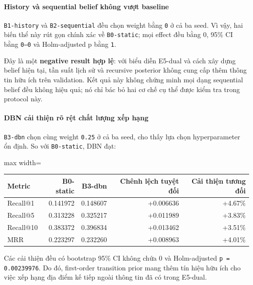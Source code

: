 \paragraph{History và sequential belief không vượt baseline}

\texttt{B1-history} và \texttt{B2-sequential} đều chọn weight bằng \texttt{0} ở cả ba seed. Vì vậy, hai biến thể này rút gọn chính xác về \texttt{B0-static}; mọi effect đều bằng 0, 95\% CI bằng \texttt{0--0} và Holm-adjusted p bằng \texttt{1}.

Đây là một \textbf{negative result hợp lệ}: với biểu diễn E5-dual và cách xây dựng belief hiện tại, tần suất lịch sử và recursive posterior không cung cấp thêm thông tin hữu ích trên validation. Kết quả này không chứng minh mọi dạng sequential belief đều không hiệu quả; nó chỉ bác bỏ hai cơ chế cụ thể được kiểm tra trong protocol này.

\paragraph{DBN cải thiện rõ rệt chất lượng xếp hạng}

\texttt{B3-dbn} chọn cùng weight \texttt{0.25} ở cả ba seed, cho thấy lựa chọn hyperparameter ổn định. So với \texttt{B0-static}, DBN đạt:

\begin{table}[!htbp]
\centering
\scriptsize
\setlength{\tabcolsep}{2.5pt}
\begin{adjustbox}{max width=\textwidth}
\begin{tabular}{@{}lrrrr@{}}
\toprule
Metric & B0-static & B3-dbn & Chênh lệch tuyệt đối & Cải thiện tương đối \\
\midrule
Recall@1 & 0.141972 & 0.148607 & +0.006636 & +4.67\% \\
Recall@5 & 0.313228 & 0.325217 & +0.011989 & +3.83\% \\
Recall@10 & 0.383372 & 0.396834 & +0.013462 & +3.51\% \\
MRR & 0.223297 & 0.232260 & +0.008963 & +4.01\% \\
\bottomrule
\end{tabular}
\end{adjustbox}
\end{table}

Các cải thiện đều có bootstrap 95\% CI không chứa 0 và Holm-adjusted \texttt{p = 0.00239976}. Do đó, first-order transition prior mang thêm tín hiệu hữu ích cho việc xếp hạng địa điểm kế tiếp ngoài thông tin đã có trong E5-dual.

